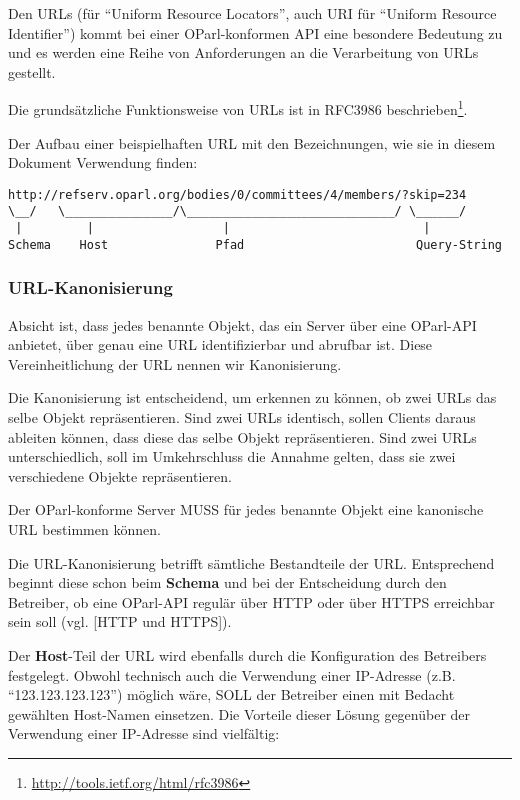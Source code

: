 \documentclass[,a4paper]{article}
\begin{document}

Den URLs (für ``Uniform Resource Locators'', auch URI für ``Uniform
Resource Identifier'') kommt bei einer OParl-konformen API eine
besondere Bedeutung zu und es werden eine Reihe von Anforderungen an die
Verarbeitung von URLs gestellt.

Die grundsätzliche Funktionsweise von URLs ist in RFC3986
beschrieben\footnote{\url{http://tools.ietf.org/html/rfc3986}}.

Der Aufbau einer beispielhaften URL mit den Bezeichnungen, wie sie in
diesem Dokument Verwendung finden:

\begin{verbatim}
http://refserv.oparl.org/bodies/0/committees/4/members/?skip=234
\__/   \_______________/\_____________________________/ \______/
 |         |                  |                           |
Schema    Host               Pfad                        Query-String
\end{verbatim}

\subsubsection{URL-Kanonisierung}

Absicht ist, dass jedes benannte Objekt, das ein Server über eine
OParl-API anbietet, über genau eine URL identifizierbar und abrufbar
ist. Diese Vereinheitlichung der URL nennen wir Kanonisierung.

Die Kanonisierung ist entscheidend, um erkennen zu können, ob zwei URLs
das selbe Objekt repräsentieren. Sind zwei URLs identisch, sollen
Clients daraus ableiten können, dass diese das selbe Objekt
repräsentieren. Sind zwei URLs unterschiedlich, soll im Umkehrschluss
die Annahme gelten, dass sie zwei verschiedene Objekte repräsentieren.

Der OParl-konforme Server MUSS für jedes benannte Objekt eine kanonische
URL bestimmen können.

Die URL-Kanonisierung betrifft sämtliche Bestandteile der URL.
Entsprechend beginnt diese schon beim \textbf{Schema} und bei der
Entscheidung durch den Betreiber, ob eine OParl-API regulär über HTTP
oder über HTTPS erreichbar sein soll (vgl. {[}HTTP und HTTPS{]}).

Der \textbf{Host}-Teil der URL wird ebenfalls durch die Konfiguration
des Betreibers festgelegt. Obwohl technisch auch die Verwendung einer
IP-Adresse (z.B. ``123.123.123.123'') möglich wäre, SOLL der Betreiber
einen mit Bedacht gewählten Host-Namen einsetzen. Die Vorteile dieser
Lösung gegenüber der Verwendung einer IP-Adresse sind vielfältig:
\end{document}

